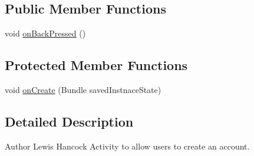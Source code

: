 \subsection*{Public Member Functions}
\begin{DoxyCompactItemize}
\item 
void \hyperlink{classuk_1_1ac_1_1swan_1_1digitaltrails_1_1accounts_1_1_sign_up_activity_aad14c8dfbeda1c7f055a8fb5dde7aa32}{on\+Back\+Pressed} ()
\end{DoxyCompactItemize}
\subsection*{Protected Member Functions}
\begin{DoxyCompactItemize}
\item 
void \hyperlink{classuk_1_1ac_1_1swan_1_1digitaltrails_1_1accounts_1_1_sign_up_activity_abdb5e9c3bc4c380148243c53deec8ef8}{on\+Create} (Bundle saved\+Instnace\+State)
\end{DoxyCompactItemize}


\subsection{Detailed Description}
\begin{DoxyAuthor}{Author}
Lewis Hancock Activity to allow users to create an account. 
\end{DoxyAuthor}


